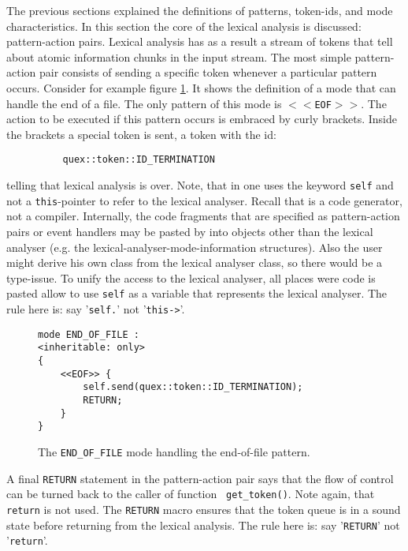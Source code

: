 The previous sections explained the definitions of patterns, token-ids, and
mode characteristics. In this section the core of the lexical analysis is
discussed: pattern-action pairs. Lexical analysis has as a result a stream of
tokens that tell about atomic information chunks in the input stream. The most
simple pattern-action pair consists of sending a specific token whenever a
particular pattern occurs. Consider for example figure
\ref{fig:eof-pattern-action-pairs}. It shows the definition of a mode that can
handle the end of a file. The only pattern of this mode is $<<${\tt EOF}$>>$.  The action
to be executed if this pattern occurs is embraced by curly brackets.
Inside the brackets a special token is sent, a token with the id:

\begin{verbatim}
          quex::token::ID_TERMINATION
\end{verbatim}

telling that lexical analysis is over. Note, that in {\quex} one uses the
keyword {\tt self} and not a {\tt this}-pointer to refer to the lexical
analyser. Recall that {\quex} is a code generator, not a compiler.
Internally, the code fragments that are specified as pattern-action pairs or
event handlers may be pasted by {\quex} into objects other than the lexical
analyser (e.g. the lexical-analyser-mode-information structures). Also the
user might derive his own class from the lexical analyser class, so there
would be a type-issue. To unify the access to the lexical analyser, all places
were code is pasted allow to use {\tt self} as a variable that represents the
lexical analyser.  The rule here is: say '{\tt self.}' not '{\tt this->}'.

\begin{figure}
\begin{lstlisting}
mode END_OF_FILE :
<inheritable: only>  
{
    <<EOF>> {
        self.send(quex::token::ID_TERMINATION);
        RETURN;
    }
}
\end{lstlisting}
\caption{The {\tt END\_OF\_FILE} mode handling the end-of-file pattern.}
\label{fig:eof-pattern-action-pairs}
\end{figure}


A final {\tt RETURN} statement in the pattern-action pair says that the
flow of control can be turned back to the caller of function {\tt
  get\_token()}. Note again, that {\tt return} is not used. The {\tt RETURN}
macro ensures that the token queue is in a sound state before returning from
the lexical analysis. The rule here is: say '{\tt RETURN}' not '{\tt return}'.

